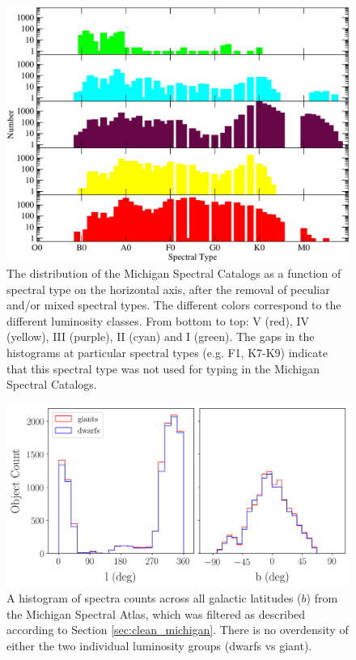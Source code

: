 \begin{figure}[t]
    \centering
        \includegraphics[width=1.0\textwidth]{Figures/populations/hist-spt-count.pdf}
\caption{The distribution of the Michigan Spectral Catalogs as a function of spectral type on the horizontal axis, after the removal of peculiar and/or mixed spectral types.  The different colors correspond to the different luminosity classes.  From bottom to top: V (red), IV (yellow), III (purple), II (cyan) and I (green).  The gaps in the histograms at particular spectral types (e.g. F1, K7-K9) indicate that this spectral type was not used for typing in the Michigan Spectral Catalogs.}
\end{figure}

\begin{figure}
    \centering
    \includegraphics[width=1.0\textwidth]{Figures/populations/hist-b-vs-count.png}
    \caption{A histogram of spectra counts across all galactic latitudes ($b$) from the Michigan Spectral Atlas, which was filtered as described according to Section \ref{sec:clean_michigan}. There is no overdensity of either the two individual luminosity groups (dwarfs vs giant).}
    \label{fig:b-vs-count}
\end{figure}

